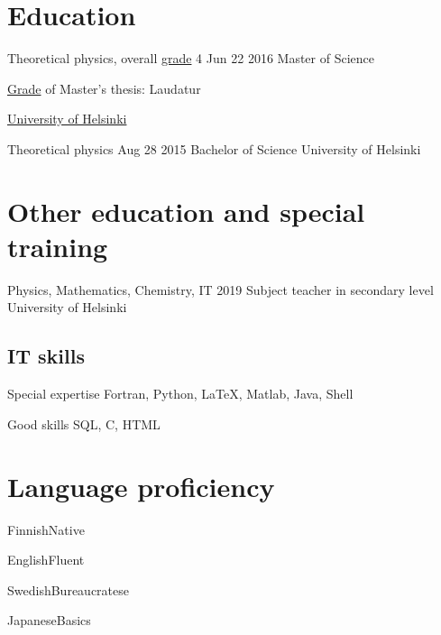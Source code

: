 \documentclass{tccv}
\begin{document}
\begin{otherlanguage}{english}


\section{Education}
\begin{yearlist}
	\item[Theoretical physics, overall \href{https://www.helsinki.fi/en/grading}{grade} 4]{Jun 22 2016}
	{Master of Science}
	{\href{https://www.helsinki.fi/en/grading}{Grade} of Master's thesis: Laudatur
		
		\href{mailto:registrar@helsinki.fi}{University of Helsinki}}
	
	\item[Theoretical physics]{Aug 28 2015}
	{Bachelor of Science}
	{University of Helsinki}
\end{yearlist}

\section{Other education and special training}
\begin{yearlist}
	\item[Physics, Mathematics, Chemistry, IT]{2019}
	{Subject teacher in secondary level}
	{University of Helsinki}
\end{yearlist}

\subsection{IT skills}
\begin{factlist}
	\item{Special expertise}
	{Fortran, Python, \LaTeX, Matlab, Java, Shell}
	
	\item{Good skills}
	{SQL, C, HTML}
\end{factlist}

\section{Language proficiency}
\begin{factlist}
	\item{Finnish}{Native}
	\item{English}{Fluent}
	\item{Swedish}{Bureaucratese}
	\item{Japanese}{Basics}
\end{factlist}


\end{otherlanguage}
\end{document}

